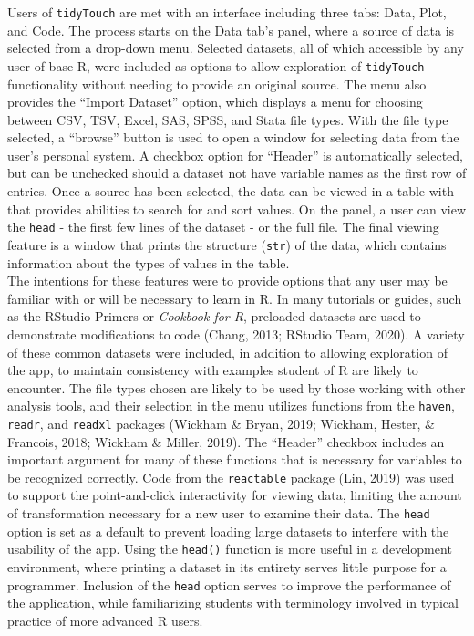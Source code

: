 \documentclass[english,man,floatsintext]{apa6}
\begin{document}
Users of \texttt{tidyTouch} are met with an interface including three tabs: Data, Plot, and Code. The process starts on the Data tab's panel, where a source of data is selected from a drop-down menu. Selected datasets, all of which accessible by any user of base R, were included as options to allow exploration of \texttt{tidyTouch} functionality without needing to provide an original source. The menu also provides the \enquote{Import Dataset} option, which displays a menu for choosing between CSV, TSV, Excel, SAS, SPSS, and Stata file types. With the file type selected, a \enquote{browse} button is used to open a window for selecting data from the user's personal system. A checkbox option for \enquote{Header} is automatically selected, but can be unchecked should a dataset not have variable names as the first row of entries. Once a source has been selected, the data can be viewed in a table with that provides abilities to search for and sort values. On the panel, a user can view the \texttt{head} - the first few lines of the dataset - or the full file. The final viewing feature is a window that prints the structure (\texttt{str}) of the data, which contains information about the types of values in the table.\\
The intentions for these features were to provide options that any user may be familiar with or will be necessary to learn in R. In many tutorials or guides, such as the RStudio Primers or \emph{Cookbook for R}, preloaded datasets are used to demonstrate modifications to code (Chang, 2013; RStudio Team, 2020). A variety of these common datasets were included, in addition to allowing exploration of the app, to maintain consistency with examples student of R are likely to encounter. The file types chosen are likely to be used by those working with other analysis tools, and their selection in the menu utilizes functions from the \texttt{haven}, \texttt{readr}, and \texttt{readxl} packages (Wickham \& Bryan, 2019; Wickham, Hester, \& Francois, 2018; Wickham \& Miller, 2019). The \enquote{Header} checkbox includes an important argument for many of these functions that is necessary for variables to be recognized correctly. Code from the \texttt{reactable} package (Lin, 2019) was used to support the point-and-click interactivity for viewing data, limiting the amount of transformation necessary for a new user to examine their data. The \texttt{head} option is set as a default to prevent loading large datasets to interfere with the usability of the app. Using the \texttt{head()} function is more useful in a development environment, where printing a dataset in its entirety serves little purpose for a programmer. Inclusion of the \texttt{head} option serves to improve the performance of the application, while familiarizing students with terminology involved in typical practice of more advanced R users.
\end{document}
